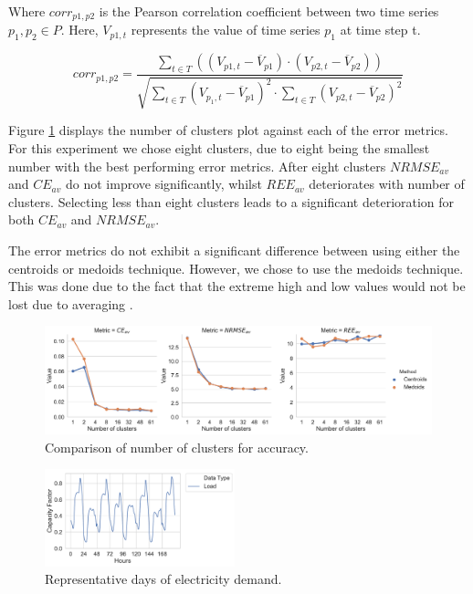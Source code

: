 \documentclass[final,3p,times,twocolumn,numbers]{elsarticle}
\begin{document}
Where $corr_{p1,p2}$ is the Pearson correlation coefficient between two time series $p_1,p_2\in P$. Here, $V_{p1,t}$ represents the value of time series $p_1$ at time step t. 

\begin{equation}
	corr_{p1,p2}=\frac
	{\sum\limits_{t\in T}\left(\left(V_{p1,t}-\overline{V}_{p1}\right)\cdot\left(V_{p2,t}-\overline{V}_{p2}\right)\right)}
	{\sqrt{
	\sum\limits_{t\in T} \left(V_{p_1,t}-\overline{V}_{p1}\right)^2\cdot\sum\limits_{t\in T}\left(V_{p2,t}-\overline{V}_{p2}\right)^2
	}}
\end{equation}

Figure \ref{fig:clusters_compared} displays the number of clusters plot against each of the error metrics. For this experiment we chose eight clusters, due to eight being the smallest number with the best performing error metrics. After eight clusters $NRMSE_{av}$ and $CE_{av}$ do not improve significantly, whilst $REE_{av}$ deteriorates with number of clusters. Selecting less than eight clusters leads to a significant deterioration for both $CE_{av}$ and $NRMSE_{av}$.

The error metrics do not exhibit a significant difference between using either the centroids or medoids technique. However, we chose to use the medoids technique. This was done due to the fact that the extreme high and low values would not be lost due to averaging \cite{Hilbers2019}.

\begin{figure}
\centering
\includegraphics[width=\textwidth]{figures/methods_and_materials/clusters_compared.pdf}
\caption{Comparison of number of clusters for accuracy.}
\label{fig:clusters_compared}
\end{figure}




\begin{figure}
\centering
\includegraphics[width=0.49\textwidth]{figures/methods_and_materials/clusters_results_load.pdf}
\caption{Representative days of electricity demand.}
\label{fig:clusters_compared_load}
\end{figure}
\end{document}

